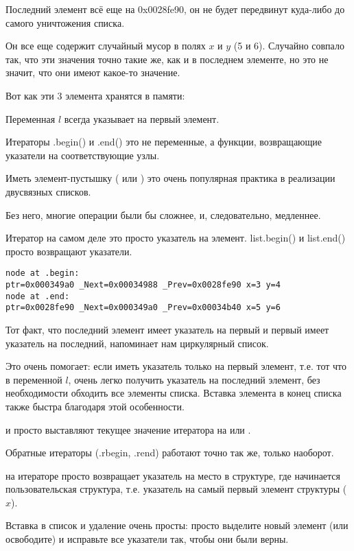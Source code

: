 Последний элемент всё еще на 0x0028fe90, 
он не будет передвинут куда-либо до самого уничтожения списка.

Он все еще содержит случайный мусор в полях $x$ и $y$ (5 и 6). 
Случайно совпало так, что эти значения точно такие же, как и в последнем элементе, но это не значит,
что они имеют какое-то значение.

Вот как эти 3 элемента хранятся в памяти:



Переменная $l$ всегда указывает на первый элемент.

Итераторы .begin() и .end() это не переменные, а функции,
возвращающие указатели на соответствующие узлы.

Иметь элемент-пустышку ( или ) это очень популярная практика в реализации двусвязных списков.%

Без него, многие операции были бы сложнее, и, следовательно, медленнее.

Итератор на самом деле это просто указатель на элемент.
list.begin() и list.end() просто возвращают указатели.

\begin{lstlisting}
node at .begin:
ptr=0x000349a0 _Next=0x00034988 _Prev=0x0028fe90 x=3 y=4
node at .end:
ptr=0x0028fe90 _Next=0x000349a0 _Prev=0x00034b40 x=5 y=6
\end{lstlisting}

Тот факт, что последний элемент имеет указатель на первый 
и первый имеет указатель на последний, напоминает нам циркулярный список.

Это очень помогает: если иметь указатель только на первый элемент, т.е.
тот что в переменной $l$, очень легко получить указатель на последний элемент, без необходимости
обходить все элементы списка.
Вставка элемента в конец списка также быстра благодаря этой особенности.

 и  просто выставляют текущее значение итератора на  или .

Обратные итераторы (.rbegin, .rend) работают точно так же, только наоборот.

 на итераторе просто возвращает указатель на место в структуре, где начинается пользовательская
структура, т.е. указатель на самый первый элемент структуры ($x$).

Вставка в список и удаление очень просты: просто выделите новый элемент (или освободите) и исправьте
все указатели так, чтобы они были верны.

